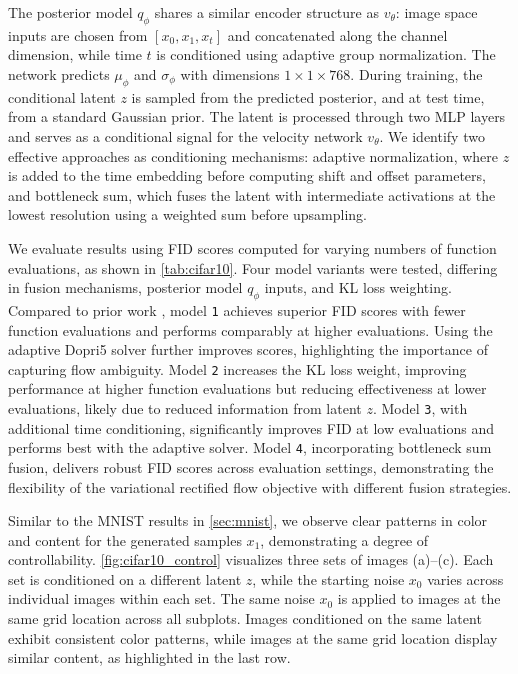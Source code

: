 The posterior model \(q_\phi\) shares a similar encoder structure as \(v_\theta\):  image space inputs are chosen from \([x_0, x_1, x_t]\) and concatenated along the channel dimension, while time \(t\) is conditioned using adaptive group normalization. The network predicts \(\mu_\phi\) and \(\sigma_\phi\) with dimensions \(1 \times 1 \times 768\). During training, the conditional latent \(z\) is sampled from the predicted posterior, and at test time, from a standard Gaussian prior. The latent is processed through two MLP layers and serves as a conditional signal for the velocity network \(v_\theta\). We identify two effective approaches as conditioning mechanisms: adaptive normalization, where \(z\) is added to the time embedding before computing shift and offset parameters, and bottleneck sum, which fuses the latent with intermediate activations at the lowest resolution using a weighted sum before upsampling. 





We evaluate results  using FID scores computed for varying numbers of function evaluations, as shown in \cref{tab:cifar10}. Four model variants were tested, differing in fusion mechanisms, posterior model \(q_\phi\) inputs, and KL loss weighting. %
Compared to prior work \citep{LipmanICLR2023, liu2023flow, tongimproving}, model \texttt{1} achieves superior FID scores with fewer function evaluations and performs comparably at higher evaluations. Using the adaptive Dopri5 solver further improves scores, highlighting the importance of capturing flow ambiguity. Model \texttt{2} increases the KL loss weight, improving performance at higher function evaluations but reducing effectiveness at lower evaluations, likely due to reduced information from latent \(z\). Model \texttt{3}, with additional time conditioning, significantly improves FID at low evaluations and performs best with the adaptive solver. Model \texttt{4}, incorporating bottleneck sum fusion, delivers robust FID scores across evaluation settings, demonstrating the flexibility of the variational rectified flow objective with different fusion strategies. 






Similar to the  MNIST results in \cref{sec:mnist}, we observe clear patterns in color and content for the generated samples \(x_1\), demonstrating a degree of controllability. %
\cref{fig:cifar10_control} visualizes three sets of images (a)–(c). Each set is conditioned on a different latent \(z\), while the starting noise \(x_0\) varies across individual images within each set. The same noise \(x_0\) is applied to images at the same grid location across all subplots. Images conditioned on the same latent exhibit consistent color patterns, while images at the same grid location display similar content, as highlighted in the last row.


